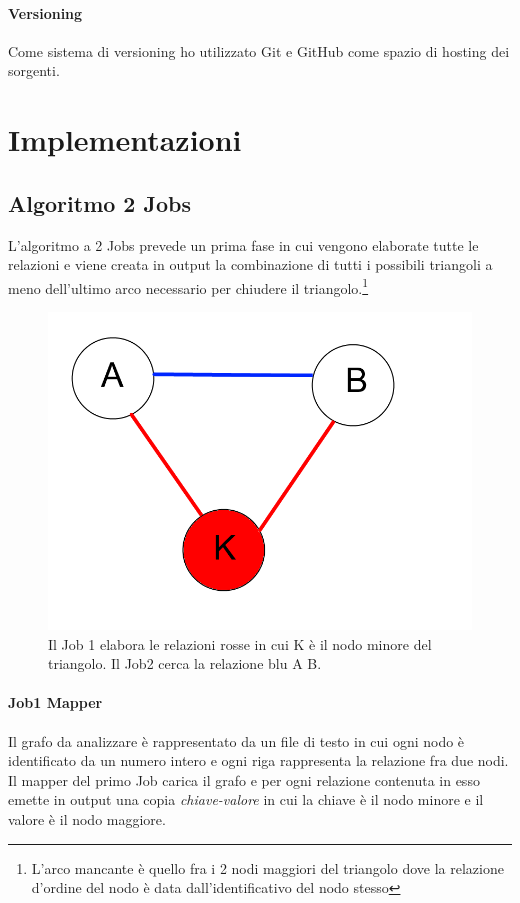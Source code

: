 \documentclass[paper=a4, fontsize=11pt]{scrartcl}	%
\numberwithin{equation}{section}															%
\numberwithin{figure}{section}																%
\numberwithin{table}{section}																%
\begin{document}
\paragraph{Versioning}
Come sistema di versioning ho utilizzato Git e GitHub come spazio di hosting dei sorgenti.


\section{Implementazioni}
\subsection{Algoritmo 2 Jobs}
L'algoritmo a 2 Jobs prevede un prima fase in cui vengono elaborate tutte le relazioni e viene creata in output la combinazione di tutti i possibili triangoli a meno dell'ultimo arco necessario per chiudere il triangolo.\footnote{L'arco mancante è quello fra i 2 nodi maggiori del triangolo dove la relazione d'ordine del nodo è data dall'identificativo del nodo stesso} \\


\begin{figure}[h]
\centering
        \includegraphics[totalheight=6cm]{Graph1.png}
    \caption{Il Job 1 elabora le relazioni rosse in cui K è il nodo minore del triangolo. Il Job2 cerca la relazione blu A B.}
    \label{fig:verticalcell} 
\end{figure}
\paragraph{Job1 Mapper}
Il grafo da analizzare è rappresentato da un file di testo in cui ogni nodo è identificato da un numero intero e ogni riga rappresenta la relazione fra due nodi.\\
Il mapper del primo Job carica il grafo e per ogni relazione contenuta in esso emette in output una copia \textit{chiave-valore} in cui la chiave è il nodo minore e il valore è il nodo maggiore.
\end{document}
